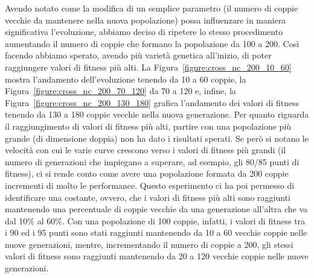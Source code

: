 Avendo notato come la modifica di un semplice parametro (il numero di coppie
vecchie da mantenere nella nuova popolazione) possa influenzare in maniera
significativa l'evoluzione, abbiamo deciso di ripetere lo stesso procedimento
aumentando il numero di coppie che formano la popolazione da 100 a 200. Così
facendo abbiamo sperato, avendo più varietà genetica all'inizio, di poter
raggiungere valori di fitness più alti.\newline
La Figura~\ref{figure:cross_nc_200_10_60} mostra l'andamento dell'evoluzione
tenendo da 10 a 60 coppie, la Figura~\ref{figure:cross_nc_200_70_120} da 70 a
120 e, infine, la Figura~\ref{figure:cross_nc_200_130_180} grafica l'andamento
dei valori di fitness tenendo da 130 a 180 coppie vecchie nella nuova
generazione.\newline
Per quanto riguarda il raggiungimento di valori di fitness più alti, partire
con una popolazione più grande (di dimensione doppia) non ha dato i risultati
sperati. Se però si notano le velocità con cui le varie curve crescono verso i
valori di fitness più grandi (il numero di generazioni che impiegano a superare,
ad esempio, gli 80/85 punti di fitness), ci si rende conto come avere una
popolazione formata da 200 coppie incrementi di molto le performance.\newline
Questo esperimento ci ha poi permesso di identificare una costante, ovvero, che
i valori di fitness più alti sono raggiunti mantenendo una percentuale
di coppie vecchie da una generazione all'altra che va dal 10\% al 60\%. Con una
popolazione di 100 coppie, infatti, i valori di fitness tra i 90 ed i 95 punti
sono stati raggiunti mantenendo da 10 a 60 vecchie coppie nelle nuove
generazioni, mentre, incrementando il numero di coppie a 200, gli stessi valori
di fitness sono raggiunti mantenendo da 20 a 120 vecchie coppie nelle nuove
generazioni.

\clearpage

